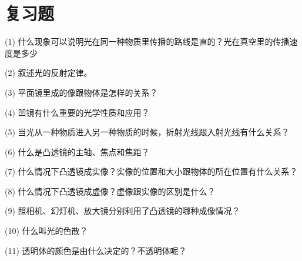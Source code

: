 \section*{复习题}

(1) 什么现象可以说明光在同一种物质里传播的路线是直的？光在真空里的传播速度是多少

(2) 叙述光的反射定律。

(3) 平面镜里成的像跟物体是怎样的关系？

(4) 凹镜有什么重要的光学性质和应用？

(5) 当光从一种物质进入另一种物质的时候，折射光线跟入射光线有什么关系？

(6) 什么是凸透镜的主轴、焦点和焦距？

(7) 什么情况下凸透镜成实像？实像的位置和大小跟物体的所在位置有什么关系？

(8) 什么情况下凸透镜成虚像？虚像跟实像的区别是什么？

(9) 照相机、幻灯机、放大镜分别利用了凸透镜的哪种成像情况？

(10) 什么叫光的色散？

(11) 透明体的颜色是由什么决定的？不透明体呢？

